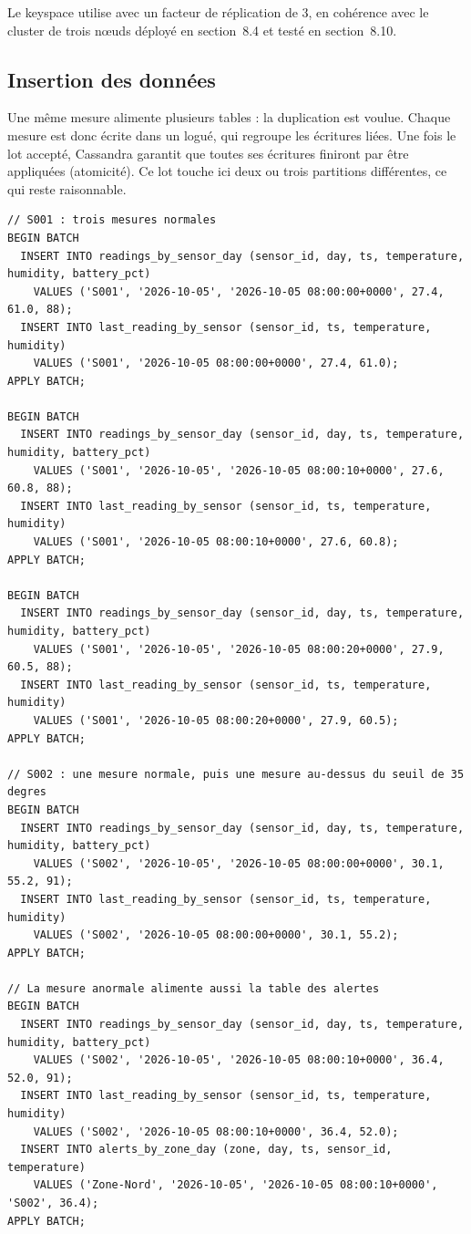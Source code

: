 \documentclass[11pt,a4paper]{article}
\newcommand{\cq}[1]{\texttt{\detokenize{#1}}}
\begin{document}
Le keyspace utilise \cq{NetworkTopologyStrategy} avec un facteur de réplication de 3, en cohérence avec le cluster de trois nœuds déployé en section~8.4 et testé en section~8.10.

\subsection{Insertion des données}
Une même mesure alimente plusieurs tables : la duplication est voulue. Chaque mesure est donc écrite dans un \cq{BATCH} logué, qui regroupe les écritures liées. Une fois le lot accepté, Cassandra garantit que toutes ses écritures finiront par être appliquées (atomicité). Ce lot touche ici deux ou trois partitions différentes, ce qui reste raisonnable.

\begin{lstlisting}[language=CQL,caption={Insertion de mesures}]
// S001 : trois mesures normales
BEGIN BATCH
  INSERT INTO readings_by_sensor_day (sensor_id, day, ts, temperature, humidity, battery_pct)
    VALUES ('S001', '2026-10-05', '2026-10-05 08:00:00+0000', 27.4, 61.0, 88);
  INSERT INTO last_reading_by_sensor (sensor_id, ts, temperature, humidity)
    VALUES ('S001', '2026-10-05 08:00:00+0000', 27.4, 61.0);
APPLY BATCH;

BEGIN BATCH
  INSERT INTO readings_by_sensor_day (sensor_id, day, ts, temperature, humidity, battery_pct)
    VALUES ('S001', '2026-10-05', '2026-10-05 08:00:10+0000', 27.6, 60.8, 88);
  INSERT INTO last_reading_by_sensor (sensor_id, ts, temperature, humidity)
    VALUES ('S001', '2026-10-05 08:00:10+0000', 27.6, 60.8);
APPLY BATCH;

BEGIN BATCH
  INSERT INTO readings_by_sensor_day (sensor_id, day, ts, temperature, humidity, battery_pct)
    VALUES ('S001', '2026-10-05', '2026-10-05 08:00:20+0000', 27.9, 60.5, 88);
  INSERT INTO last_reading_by_sensor (sensor_id, ts, temperature, humidity)
    VALUES ('S001', '2026-10-05 08:00:20+0000', 27.9, 60.5);
APPLY BATCH;

// S002 : une mesure normale, puis une mesure au-dessus du seuil de 35 degres
BEGIN BATCH
  INSERT INTO readings_by_sensor_day (sensor_id, day, ts, temperature, humidity, battery_pct)
    VALUES ('S002', '2026-10-05', '2026-10-05 08:00:00+0000', 30.1, 55.2, 91);
  INSERT INTO last_reading_by_sensor (sensor_id, ts, temperature, humidity)
    VALUES ('S002', '2026-10-05 08:00:00+0000', 30.1, 55.2);
APPLY BATCH;

// La mesure anormale alimente aussi la table des alertes
BEGIN BATCH
  INSERT INTO readings_by_sensor_day (sensor_id, day, ts, temperature, humidity, battery_pct)
    VALUES ('S002', '2026-10-05', '2026-10-05 08:00:10+0000', 36.4, 52.0, 91);
  INSERT INTO last_reading_by_sensor (sensor_id, ts, temperature, humidity)
    VALUES ('S002', '2026-10-05 08:00:10+0000', 36.4, 52.0);
  INSERT INTO alerts_by_zone_day (zone, day, ts, sensor_id, temperature)
    VALUES ('Zone-Nord', '2026-10-05', '2026-10-05 08:00:10+0000', 'S002', 36.4);
APPLY BATCH;
\end{lstlisting}
\end{document}
